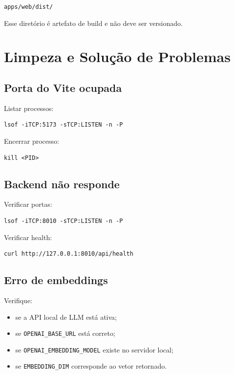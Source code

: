 \documentclass[12pt,a4paper]{article}
\begin{document}
\begin{verbatim}
apps/web/dist/
\end{verbatim}

Esse diretório é artefato de build e não deve ser versionado.

\section{Limpeza e Solução de Problemas}

\subsection{Porta do Vite ocupada}

Listar processos:

\begin{verbatim}
lsof -iTCP:5173 -sTCP:LISTEN -n -P
\end{verbatim}

Encerrar processo:

\begin{verbatim}
kill <PID>
\end{verbatim}

\subsection{Backend não responde}

Verificar portas:

\begin{verbatim}
lsof -iTCP:8010 -sTCP:LISTEN -n -P
\end{verbatim}

Verificar health:

\begin{verbatim}
curl http://127.0.0.1:8010/api/health
\end{verbatim}

\subsection{Erro de embeddings}

Verifique:

\begin{itemize}
  \item se a API local de LLM está ativa;
  \item se \texttt{OPENAI\_BASE\_URL} está correto;
  \item se \texttt{OPENAI\_EMBEDDING\_MODEL} existe no servidor local;
  \item se \texttt{EMBEDDING\_DIM} corresponde ao vetor retornado.
\end{itemize}
\end{document}
